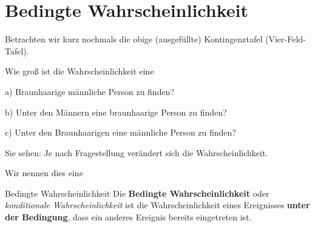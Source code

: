 
\section{Bedingte Wahrscheinlichkeit}

Betrachten wir kurz nochmals die obige (ausgefüllte) Kontingenztafel (Vier-Feld-Tafel).

Wie groß ist die Wahrscheinlichkeit eine

a) Braunhaarige männliche Person zu finden? 

b) Unter den Männern eine braunhaarige Person zu finden? 

c) Unter den Braunhaarigen eine männliche Person zu finden? 

Sie sehen: Je nach Fragestellung verändert sich die Wahrscheinlichkeit.

Wir nennen dies eine

\begin{definition}{Bedingte Wahrscheinlichkeit}{}
Die \textbf{Bedingte Wahrscheinlichkeit} oder \textit{konditionale
  Wahrscheinlichkeit} ist die Wahrscheinlichkeit eines Ereignisses
\textbf{unter der Bedingung}, dass ein anderes Ereignis bereits
eingetreten ist.
  \end{definition}

\newpage



